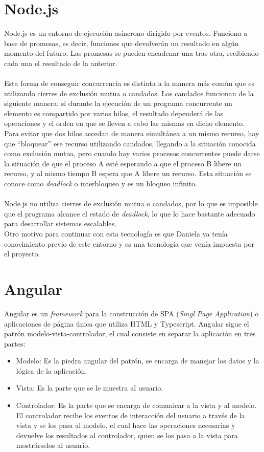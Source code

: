 \documentclass[11pt]{book}
\begin{document}
	\section{Node.js} 
	Node.js \cite{node} es un entorno de ejecución asíncrono dirigido por eventos. Funciona a base de promesas, es decir, funciones que devolverán un resultado en algún momento del futuro. Las promesas se pueden encadenar una tras otra, recibiendo cada una el resultado de la anterior.\\\\
	Esta forma de conseguir concurrencia es distinta a la manera más común que es utilizando cierres de exclusión mutua o candados. Los candados funcionan de la siguiente manera: si durante la ejecución de un programa concurrente un elemento es compartido por varios hilos, el resultado dependerá de las operaciones y el orden en que se lleven a cabo las mismas en dicho elemento. Para evitar que dos hilos accedan de manera simultánea a un mismo recurso, hay que ``bloquear'' ese recurso utilizando candados, llegando a la situación conocida como exclusión mutua, pero cuando hay varios procesos concurrentes puede darse la situación de que el proceso A esté esperando a que el proceso B libere un recurso, y al mismo tiempo B espera que A libere un recurso. Esta situación se conoce como \emph{deadlock} o interbloqueo y es un bloqueo infinito.\\\\
	Node.js no utiliza cierres de exclusión mutua o candados, por lo que es imposible que el programa alcance el estado de \emph{deadlock}, lo que lo hace bastante adecuado para desarrollar sistemas escalables.\\
	Otro motivo para continuar con esta tecnología es que Daniela ya tenía conocimiento previo de este entorno y es una tecnología que venía impuesta por el proyecto.
	
	\section{Angular}
	Angular \cite{angular} es un \emph{framework} para la construcción de SPA (\textit{Singl Page Application}) o aplicaciones de página única que utiliza HTML y Typescript. Angular sigue el patrón modelo-vista-controlador, el cual consiste en separar la aplicación en tres partes:
	\begin{itemize}
		\item Modelo: Es la piedra angular del patrón, se encarga de manejar los datos y la lógica de la aplicación.
		\item Vista: Es la parte que se le muestra al usuario.
		\item Controlador: Es la parte que se encarga de comunicar a la vista y al modelo. El controlador recibe los eventos de interacción del usuario a través de la vista y se los pasa al modelo, el cual hace las operaciones necesarias y devuelve los resultados al controlador, quien se los pasa a la vista para mostrárselos al usuario.
	\end{itemize}
	
\end{document}
